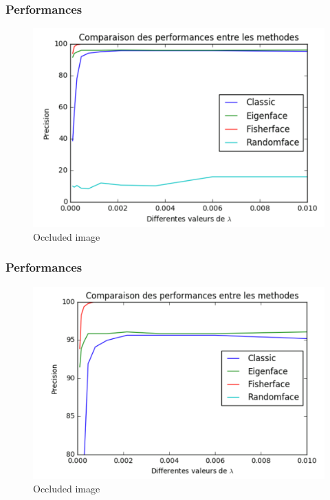 \documentclass{beamer}
\begin{document}

\begin{frame}

		\frametitle{Performances}



			\begin{figure}[!ht]
			\begin{center}
			\includegraphics[scale=0.25]{perf1.png}
			\end{center}
			\caption{Occluded image}
			\label{fa}
			\end{figure}
	
		
\end{frame}
		

\begin{frame}

		\frametitle{Performances}



			\begin{figure}[!ht]
			\begin{center}
			\includegraphics[scale=0.25]{perf2.png}
			\end{center}
			\caption{Occluded image}
			\label{fa}
			\end{figure}
	
		
\end{frame}
\end{document}
